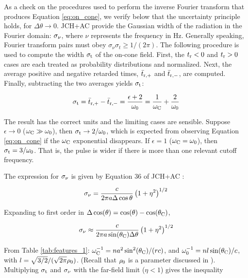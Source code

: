 \documentclass[amsmath,amssymb,aps,prd,10pt,twocolumn]{revtex4}
\begin{document}
As a check on the procedures used to perform the inverse Fourier transform that produces Equation \ref{eq:on_cone}, we verify below that the uncertainty principle holds, for $\Delta\theta \to 0$.  JCH+AC provide the Gaussian width of the radiation in the Fourier domain: $\sigma_{\rm \nu}$, where $\nu$ represents the frequency in Hz.  Generally speaking, Fourier transform pairs must obey $\sigma_\nu \sigma_t \geq 1/(2\pi)$.  The following procedure is used to compute the width $\sigma_{\rm t}$ of the on-cone field.  First, the $t_{\rm r} < 0$ and $t_{\rm r} > 0$ cases are each treated as probability distributions and normalized.  Next, the average positive and negative retarded times, $\bar{t}_{\rm r,+}$ and $\bar{t}_{\rm r,-}$, are computed.  Finally, subtracting the two averages yields $\sigma_{\rm t}$:

\begin{equation}
\sigma_{\rm t} = \bar{t}_{\rm r,+} - \bar{t}_{\rm r,-} = \frac{\epsilon+2}{\omega_{\rm 0}} = \frac{1}{\omega_{\rm C}} + \frac{2}{\omega_{\rm 0}} \label{eq:width_oncone}
\end{equation}

The result has the correct units and the limiting cases are sensible.  Suppose $\epsilon \to 0$ ($\omega_{\rm C} \gg \omega_{\rm 0}$), then $\sigma_{\rm t} \to 2/\omega_{\rm 0}$, which is expected from observing Equation \ref{eq:on_cone} if the $\omega_{\rm C}$ exponential disappears.  If $\epsilon = 1$ ($\omega_{\rm C} = \omega_{\rm 0}$), then $\sigma_{\rm t} = 3/\omega_{\rm 0}$.  That is, the pulse is wider if there is more than one relevant cutoff frequency.

The expression for $\sigma_{\rm \nu}$ is given by Equation 36 of JCH+AC \cite{10.1016/j.astropartphys.2017.03.008}:

\begin{equation}
\sigma_{\rm \nu} = \frac{c}{2\pi a \Delta\cos\theta}\left(1+\eta^2\right)^{1/2} \label{eq:sigmanu}
\end{equation}

Expanding to first order in $\Delta\cos(\theta) = \cos(\theta) - \cos(\theta_{\rm C})$,

\begin{equation}
\sigma_{\rm \nu} \approx \frac{c}{2\pi a \sin(\theta_{\rm C}) \Delta\theta}\left(1+\eta^2\right)^{1/2} \label{eq:sigmanu2}
\end{equation}

From Table \ref{tab:features_1}: $\omega_{\rm C}^{-1} = n a^2 \sin^2(\theta_{\rm C})/(rc)$, and $\omega_{\rm 0}^{-1} = n l \sin(\theta_{\rm C})/c$, with $l = \sqrt{3/2}/(\sqrt{2\pi} \rho_{\rm 0})$.  (Recall that $\rho_{\rm 0}$ is a parameter discussed in \cite{10.1016/j.astropartphys.2017.03.008}). Multiplying $\sigma_{\rm t}$ and $\sigma_{\rm \nu}$ with the far-field limit ($\eta < 1$) gives the inequality
\end{document}
